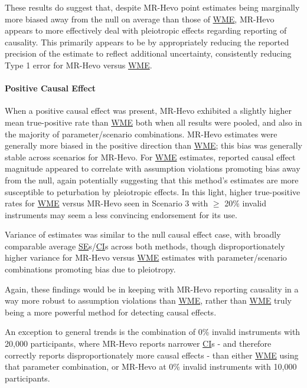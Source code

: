 \documentclass[
]{article}
\begin{document}
These results do suggest that, despite MR-Hevo point estimates being marginally more biased away from the null on average than those of \hyperref[acronyms_WME]{WME}, MR-Hevo appears to more effectively deal with pleiotropic effects regarding reporting of causality. This primarily appears to be by appropriately reducing the reported precision of the estimate to reflect additional uncertainty, consistently reducing Type 1 error for MR-Hevo versus \hyperref[acronyms_WME]{WME}.

\paragraph{Positive Causal Effect}\label{positive-causal-effect}

\leavevmode\newline When a positive causal effect was present, MR-Hevo exhibited a slightly higher mean true-positive rate than \hyperref[acronyms_WME]{WME} both when all results were pooled, and also in the majority of parameter/scenario combinations. MR-Hevo estimates were generally more biased in the positive direction than \hyperref[acronyms_WME]{WME}; this bias was generally stable across scenarios for MR-Hevo. For \hyperref[acronyms_WME]{WME} estimates, reported causal effect magnitude appeared to correlate with assumption violations promoting bias away from the null, again potentially suggesting that this method's estimates are more susceptible to peturbation by pleiotropic effects. In this light, higher true-positive rates for \hyperref[acronyms_WME]{WME} versus MR-Hevo seen in Scenario 3 with \(\ge\) 20\% invalid instruments may seem a less convincing endorsement for its use.

Variance of estimates was similar to the null causal effect case, with broadly comparable average \hyperref[acronyms_SE]{SE}s/\hyperref[acronyms_CI]{CI}s across both methods, though disproportionately higher variance for MR-Hevo versus \hyperref[acronyms_WME]{WME} estimates with parameter/scenario combinations promoting bias due to pleiotropy.

Again, these findings would be in keeping with MR-Hevo reporting causality in a way more robust to assumption violations than \hyperref[acronyms_WME]{WME}, rather than \hyperref[acronyms_WME]{WME} truly being a more powerful method for detecting causal effects.

An exception to general trends is the combination of 0\% invalid instruments with 20,000 participants, where MR-Hevo reports narrower \hyperref[acronyms_CI]{CI}s - and therefore correctly reports disproportionately more causal effects - than either \hyperref[acronyms_WME]{WME} using that parameter combination, or MR-Hevo at 0\% invalid instruments with 10,000 participants.
\end{document}
